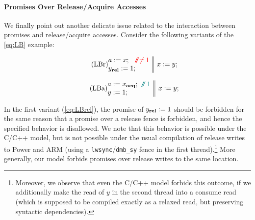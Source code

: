\paragraph{Promises Over Release/Acquire Accesses}
We finally point out another delicate issue related to the interaction between
promises and release/acquire accesses.
Consider the following variants of the \ref{eq:LB} example:
\begin{center}
\hspace*{-2mm}
\begin{minipage}{.5\columnwidth}
\begin{equation}\label{eq:LBrel}\tag{LBr}
\inarrII{ a:=x; \nocomment{1}\hspace*{-2pt}\\ y_{\relw}:=1; }{\hspace*{-2pt} x:=y; }
\end{equation}
\end{minipage}
\hfill
\begin{minipage}{.5\columnwidth}
\begin{equation}\label{eq:LBacq}\tag{LBa}
\inarrII{ a:=x_{\acqr}; \comment{1}\hspace*{-2pt} \\ y:=1; }{\hspace*{-2pt} x:=y; }
\end{equation}
\end{minipage}
\end{center}
%
In the first variant (\ref{eq:LBrel}), the promise of $y_{\textbf{rel}}:=1$ should be forbidden
for the same reason that a promise over a release fence is forbidden,
and hence the specified behavior is disallowed.
We note that this behavior is possible under the C/C++ model, 
but is not possible under the usual compilation of release writes
to Power and ARM (using a \texttt{lwsync}/\texttt{dmb\_sy} fence in the first thread).\footnote{%
Moreover, we observe that even the C/C++ model forbids this outcome, 
if we additionally make the read of $y$ in the second thread into a consume read 
(which is supposed to be compiled exactly as a relaxed read, but preserving syntactic dependencies).}
More generally, our model forbids promises over release writes to the same location.

